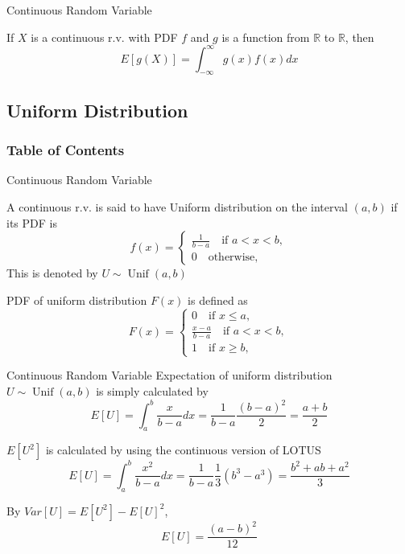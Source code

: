 \documentclass[8pt]{beamer}
\newcommand{\myunif}[2]{\operatorname{Unif}\!\left(#1, #2\right)}
\begin{document}
\begin{frame}{Continuous Random Variable}
    \begin{theorem}
        If $X$ is a continuous r.v. with PDF $f$ and $g$ is a function from $\mathbb{R}$ to $\mathbb{R}$, then
        \[
            E[g(X)] = \int_{-\infty}^\infty g(x)f(x) dx
        \]
    \end{theorem}
\end{frame}

\subsection{Uniform Distribution}

\begin{frame}
    \frametitle{Table of Contents}
    \tableofcontents[currentsubsection]
\end{frame}


\begin{frame}{Continuous Random Variable}
    \begin{definition}
        A continuous r.v. is said to have Uniform distribution on the interval $(a,b)$ if its PDF is
        \[
        f(x) = \begin{cases}
            \frac{1}{b-a}\quad \text{if } a<x<b, \\ 0 \quad \text{otherwise},
        \end{cases}
        \]
        This is denoted by $U \sim \myunif{a}{b} $
    \end{definition}

    PDF of uniform distribution $F(x)$ is defined as
    \[
        F(x) = \begin{cases}
            0 \quad \text{if } x\leq a,
            \\ \frac{x-a}{b-a} \quad \text{if } a < x <b,
            \\ 1 \quad \text{if } x \geq b,
        \end{cases}
    \]
\end{frame}

\begin{frame}{Continuous Random Variable}
    Expectation of uniform distribution $U \sim \myunif{a}{b}$ is simply calculated by 
    \[
    E[U] = \int_a^b \frac{x}{b-a} dx = \frac{1}{b-a} \frac{(b-a)^2}{2} = \frac{a+b}{2}
    \]

    $E[U^2]$ is calculated by using the continuous version of LOTUS
    \[
    E[U] = \int_a^b \frac{x^2}{b-a} dx = \frac{1}{b-a} \frac{1}{3}(b^3-a^3) = \frac{b^2 + ab + a^2}{3}
    \]

    By $Var[U] = E[U^2] - E[U]^2$,
    \[
        E[U] = \frac{(a-b)^2}{12}
    \]

\end{frame}
\end{document}
